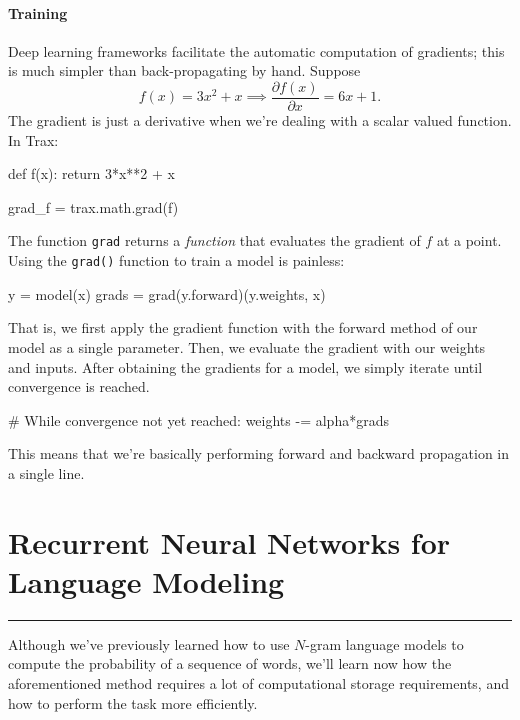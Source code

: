 \documentclass[12pt]{article}
\begin{document}
\paragraph{Training} Deep learning frameworks facilitate the automatic computation of gradients; this is much simpler than back-propagating by hand. Suppose
\[
f(x) = 3x^2 + x \implies \frac{\partial f(x)}{\partial x} = 6x + 1.
\]
The gradient is just a derivative when we're dealing with a scalar valued function. In Trax:
\begin{python}
def f(x):
  return 3*x**2 + x

grad_f = trax.math.grad(f)
\end{python}
The function \texttt{grad} returns a \emph{function} that evaluates the gradient of $f$ at a point. Using the \texttt{grad()} function to train a model is painless:
\begin{python}
y = model(x)
grads = grad(y.forward)(y.weights, x)
\end{python}
That is, we first apply the gradient function with the forward method of our model as a single parameter. Then, we evaluate the gradient with our weights and inputs. After obtaining the gradients for a model, we simply iterate until convergence is reached.
\begin{python}
# While convergence not yet reached:
weights -= alpha*grads  
\end{python}
This means that we're basically performing forward and backward propagation in a single line.

\section{Recurrent Neural Networks for Language Modeling}\vspace{.1pt} \hrule height 2pt \smallskip \renewcommand{\arraystretch}{1}%
Although we've previously learned how to use $N$-gram language models to compute the probability of a sequence of words, we'll learn now how the aforementioned method requires a lot of computational storage requirements, and how to perform the task more efficiently.
\end{document}
